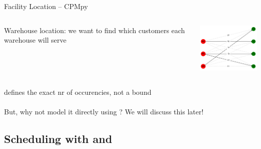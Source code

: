 \documentclass{cons-beamer}
\begin{document}
\begin{flashcardcpmpy}
\begin{frame}{Facility Location -- CPMpy}
  \vspace{-1.5em}
  \begin{columns}
    \begin{column}{0.6\textwidth}
      Warehouse location: we want to find which customers each warehouse will serve
    \end{column}
    \begin{column}{0.4\textwidth}
      \includegraphics[width=40mm]{images/warehouse_plot.png} \\
    \end{column}
  \end{columns}

  \begin{example}[CPMpy]
    \vspace{-0.5em}
    \footnotesize
    
    \vspace{-0.5em}
  \end{example}

  \alert{ defines the exact nr of occurencies, not a bound} \\ \vfill
   \\ \vfill 
  But, why not model it directly using ? 
  We will discuss this later!  
\end{frame}
\end{flashcardcpmpy}


\subsection{Scheduling with  and }
\end{document}
